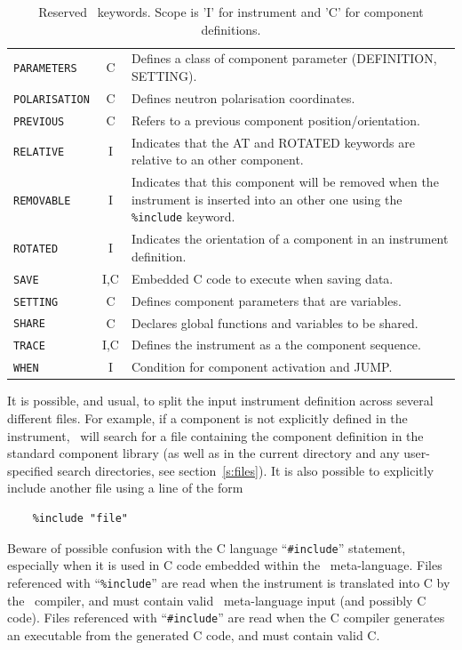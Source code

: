 \begin{table}
\begin{center}
{\begin{tabular}{|l|c|p{}|}
      \texttt{PARAMETERS} & C & Defines a class of component parameter (DEFINITION, SETTING). \\
      \texttt{POLARISATION} & C & Defines neutron polarisation coordinates. \\
      \texttt{PREVIOUS} & C & Refers to a previous component position/orientation.\\
      \texttt{RELATIVE} & I & Indicates that the AT and ROTATED keywords are relative to an other component. \\
      \texttt{REMOVABLE} & I & Indicates that this component will be removed when the instrument is inserted into an other one using the \texttt{\%include} keyword. \\
      \texttt{ROTATED} & I & Indicates the orientation of a component in an instrument definition. \\
      \texttt{SAVE} & I,C & Embedded C code to execute when saving data. \\
      \texttt{SETTING} & C & Defines component parameters that are
      variables. \\
      \texttt{SHARE} & C & Declares global functions and variables to be shared. \\
      \texttt{TRACE} & I,C & Defines the instrument as a the component sequence. \\
      \texttt{WHEN}  & I & Condition for component activation and JUMP.\\
      \hline
    \end{tabular}
    \caption{Reserved \MCS\ keywords.
    Scope is 'I' for instrument and 'C' for component definitions.}
    \label{t:keywords}
    }
  \end{center}
\end{table}

It is possible, and usual, to split the input instrument definition
across several different files. For example, if a component is not
explicitly defined in the instrument,
\MCS\ will search for a file containing the component definition in the
standard component library (as well as in the current directory and any
user-specified search directories, see section~\ref{s:files}). It is
also possible to explicitly include another file using a line of the
form 
\begin{verbatim}
    %include "file"
\end{verbatim}
Beware of possible confusion with the C language ``\verb+#include+''
statement, especially when it is used in C code embedded within the
\MCS\ meta-language. Files referenced with ``\verb+%include+'' are read
when the instrument is translated into C by the \MCS\ compiler, and must
contain valid \MCS\ meta-language input (and possibly C code). Files referenced with
``\verb+#include+'' are read when the C compiler generates an
executable from the generated C code, and must contain valid C.

